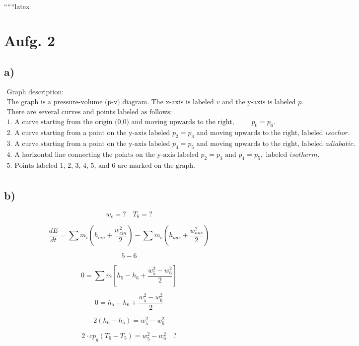
``````latex


\section*{Aufg. 2}

\subsection*{a)}

\[
\begin{array}{c}
\text{Graph description:} \\
\text{The graph is a pressure-volume (p-v) diagram. The x-axis is labeled } v \text{ and the y-axis is labeled } p. \\
\text{There are several curves and points labeled as follows:} \\
\text{1. A curve starting from the origin (0,0) and moving upwards to the right, labeled } p_0 = p_6. \\
\text{2. A curve starting from a point on the y-axis labeled } p_2 = p_3 \text{ and moving upwards to the right, labeled } isochor. \\
\text{3. A curve starting from a point on the y-axis labeled } p_4 = p_5 \text{ and moving upwards to the right, labeled } adiabatic. \\
\text{4. A horizontal line connecting the points on the y-axis labeled } p_2 = p_3 \text{ and } p_4 = p_5, \text{ labeled } isotherm. \\
\text{5. Points labeled 1, 2, 3, 4, 5, and 6 are marked on the graph.} \\
\end{array}
\]

\subsection*{b)}

\[
w_c = ? \quad T_6 = ?
\]

\[
\frac{dE}{dt} = \sum \dot{m}_i \left( h_{ein} + \frac{w_{ein}^2}{2} \right) - \sum \dot{m}_e \left( h_{aus} + \frac{w_{aus}^2}{2} \right)
\]

\[
5-6
\]

\[
0 = \sum \dot{m} \left[ h_5 - h_6 + \frac{w_5^2 - w_6^2}{2} \right]
\]

\[
0 = h_5 - h_6 + \frac{w_5^2 - w_6^2}{2}
\]

\[
2 \left( h_6 - h_5 \right) = w_5^2 - w_6^2
\]

\[
2 \cdot cp_g (T_6 - T_5) = w_5^2 - w_6^2 \quad ?
\]

